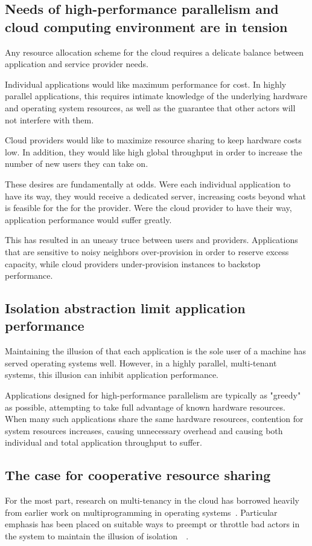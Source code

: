 \subsection{Needs of high-performance parallelism and cloud computing environment are in tension}
Any resource allocation scheme for the cloud requires a delicate balance between application and service provider needs. 

Individual applications would like maximum performance for cost. In highly parallel applications, this requires intimate knowledge of the underlying hardware and operating system resources, as well as the guarantee that other actors will not interfere with them. 

Cloud providers would like to maximize resource sharing to keep hardware costs low. In addition, they would like high global throughput in order to increase the number of new users they can take on.

These desires are fundamentally at odds. Were each individual application to have its way, they would receive a dedicated server, increasing costs beyond what is feasible for the for the provider. Were the cloud provider to have their way, application performance would suffer greatly.

This has resulted in an uneasy truce between users and providers. Applications that are sensitive to noisy neighbors over-provision in order to reserve excess capacity, while cloud providers under-provision instances to backstop performance.

\subsection{Isolation abstraction limit application performance}
Maintaining the illusion of that each application is the sole user of a machine has served operating systems well. However, in a highly parallel, multi-tenant systems, this illusion can inhibit application performance.

Applications designed for high-performance parallelism are typically as "greedy" as possible, attempting to take full advantage of known hardware resources. When many such applications share the same hardware resources, contention for system resources increases, causing unnecessary overhead and causing both individual and total application throughput to suffer.

\subsection{The case for cooperative resource sharing}
For the most part, research on multi-tenancy in the cloud has borrowed heavily from earlier work on multiprogramming in operating systems~\cite{krebs2015performance}. Particular emphasis has been placed on suitable ways to preempt or throttle bad actors in the system to maintain the illusion of isolation~~\cite{multitenancy2012enforcing}. 

